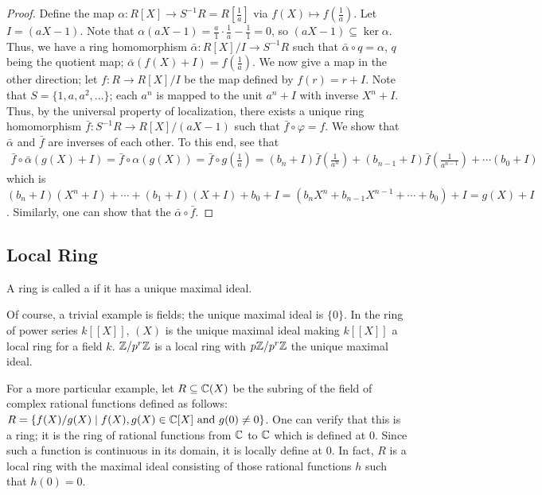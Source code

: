 \begin{proof}
    Define the map $\alpha: R[X] \to S^{-1}R = R[\frac{1}{a}]$ via $f(X) \mapsto f(\frac{1}{a})$. Let $I = (aX - 1)$. Note that $\alpha (aX - 1) = \frac{a}{1} \cdot \frac{1}{a} - \frac{1}{1} = 0$, so $(aX - 1) \subseteq \ker \alpha$. Thus, we have a ring homomorphism $\bar{\alpha}: R[X]/I \to S^{-1}R$ such that $\bar{\alpha} \circ q = \alpha$, $q$ being the quotient map; $\bar{\alpha} (f(X) + I) = f(\frac{1}{a})$. We now give a map in the other direction; let $f : R \to R[X]/I$ be the map defined by $f(r) = r + I$. Note that $S = \{1,a,a^{2},\ldots\}$; each $a^{n}$ is mapped to the unit $a^{n} + I$ with inverse $X^{n} + I$. Thus, by the universal property of localization, there exists a unique ring homomorphism $\bar{f} : S^{-1} R \to R[X]/(aX - 1)$ such that $\bar{f} \circ \varphi = f$. We show that $\bar{\alpha}$ and $\bar{f}$ are inverses of each other. To this end, see that
    \begin{align}
        \bar{f} \circ \bar{\alpha} (g(X) + I) = \bar{f} \circ \alpha (g(X)) = \bar{f} \circ g(\frac{1}{a}) = (b_{n}+I) \bar{f}(\frac{1}{a^{n}}) + (b_{n-1}+I) \bar{f}(\frac{1}{a^{n-1}}) + \cdots (b_{0}+I)
    \end{align}
    which is $(b_{n}+I)(X^{n}+I) + \cdots + (b_{1}+I)(X+I) + b_{0}+I = (b_{n}X^{n} + b_{n-1}X^{n-1} + \cdots + b_{0}) + I = g(X) + I$. Similarly, one can show that the $\bar{\alpha} \circ \bar{f}$.
\end{proof}

\subsection{Local Ring}

\begin{definition}
    A ring is called a  if it has a unique maximal ideal.
\end{definition}

Of course, a trivial example is fields; the unique maximal ideal is $\{0\}$. In the ring of power series $k[[X]]$, $(X)$ is the unique maximal ideal making $k[[X]]$ a local ring for a field $k$. $\mathbb{Z}/p^{r}\mathbb{Z}$ is a local ring with $p\mathbb{Z}/p^{r}\mathbb{Z}$ the unique maximal ideal.

For a more particular example, let $R \subseteq \mathbb{C}(X)$ be the subring of the field of complex rational functions defined as follows: $R = \{f(X)/g(X) \mid f(X),g(X) \in \mathbb{C}[X] \text{ and } g(0) \neq 0 \}$. One can verify that this is a ring; it is the ring of rational functions from $\mathbb{C}$ to $\mathbb{C}$ which is defined at $0$. Since such a function is continuous in its domain, it is locally define at $0$. In fact, $R$ is a local ring with the maximal ideal consisting of those rational functions $h$ such that $h(0) = 0$.
\\


